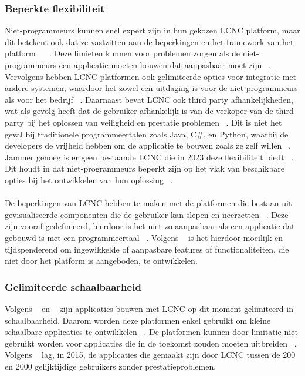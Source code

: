 \subsubsection{Beperkte flexibiliteit}
\label{subsec:beperkte-flexibiliteit}
Niet-programmeurs kunnen snel expert zijn in hun gekozen LCNC platform, maar dit betekent ook dat ze vastzitten aan de beperkingen en het framework van het platform 
~\autocite{Sufi_2023} ~\autocite{Talesra_2021}. 
Deze limieten kunnen voor problemen zorgen als de niet-programmeurs een applicatie moeten bouwen dat aanpasbaar moet zijn ~\autocite{Talesra_2021}. 
Vervolgens hebben LCNC platformen ook gelimiteerde opties voor integratie met andere systemen, waardoor het zowel een uitdaging is voor de niet-programmeurs als 
voor het bedrijf ~\autocite{Talesra_2021}. Daarnaast bevat LCNC ook third party afhankelijkheden, wat als gevolg heeft dat de gebruiker afhankelijk is van de verkoper van de 
third party bij het oplossen van veiligheid en prestatie problemen ~\autocite{Talesra_2021}. Dit is niet het geval bij traditionele programmeertalen zoals Java, C\#, en Python, 
waarbij de developers de vrijheid hebben om de applicatie te bouwen zoals ze zelf willen ~\autocite{Sufi_2023}. Jammer genoeg is er geen bestaande LCNC die in 2023 deze 
flexibiliteit biedt ~\autocite{Sufi_2023}. Dit houdt in dat niet-programmeurs beperkt zijn op het vlak van beschikbare opties bij het ontwikkelen van hun oplossing ~\autocite{Sufi_2023}. 
\\
\\
De beperkingen van LCNC hebben te maken met de platformen die bestaan uit gevisualiseerde componenten die de gebruiker kan slepen en
 neerzetten ~\autocite{Yan2021}. Deze zijn vooraf gedefinieerd, hierdoor is het niet zo aanpasbaar als een applicatie 
 dat gebouwd is met een programmeertaal ~\autocite{Yan2021}. Volgens ~\textcite{Yan2021} 
is het hierdoor moeilijk en tijdspenderend om ingewikkelde of aanpasbare features of functionaliteiten, die niet door het platform is aangeboden, te ontwikkelen.
\subsubsection*{Gelimiteerde schaalbaarheid}
\label{subsec:gelimiteerde-schaalbaarheid}
Volgens ~\textcite{Elshan2023} en ~\textcite{Sufi_2023} zijn applicaties bouwen met LCNC op dit moment gelimiteerd in schaalbaarheid. Daarom worden deze platformen enkel gebruikt om kleine schaalbare applicaties te ontwikkelen ~\autocite{Sufi_2023}. 
De platformen kunnen door limitatie niet gebruikt worden voor applicaties die in de toekomst zouden moeten uitbreiden ~\autocite{Elshan2023}. 
Volgens ~\textcite{Yan2021} lag, in 2015, de applicaties die gemaakt zijn door LCNC tussen de 200 en 2000 gelijktijdige gebruikers zonder prestatieproblemen.

